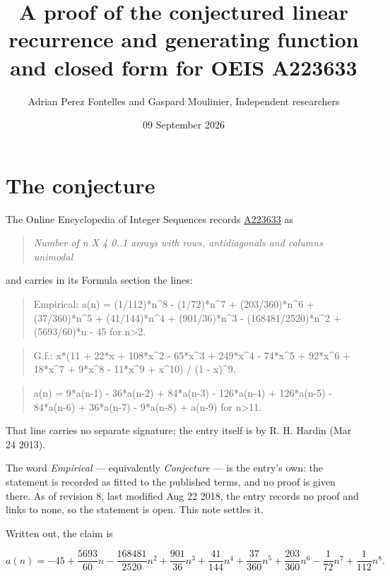 \documentclass[11pt]{article}
\title{A proof of the conjectured linear recurrence and generating function and closed form for OEIS A223633}
\author{Adrian Perez Fontelles and Gaspard Moulinier, Independent researchers}
\date{09 September 2026}
\theoremstyle{definition}
\begin{document}
\maketitle
\section{The conjecture}

The Online Encyclopedia of Integer Sequences records \href{https://oeis.org/A223633}{A223633} as

\begin{quote}\itshape Number of n X 4 0..1 arrays with rows, antidiagonals and columns unimodal\end{quote}

and carries in its Formula section the lines:

\begin{quote}\ttfamily Empirical: a(n) = (1/112)*n\textasciicircum{}8 - (1/72)*n\textasciicircum{}7 + (203/360)*n\textasciicircum{}6 + (37/360)*n\textasciicircum{}5 + (41/144)*n\textasciicircum{}4 + (901/36)*n\textasciicircum{}3 - (168481/2520)*n\textasciicircum{}2 + (5693/60)*n - 45 for n>2.\end{quote}

\begin{quote}\ttfamily G.f.: x*(11 + 22*x + 108*x\textasciicircum{}2 - 65*x\textasciicircum{}3 + 249*x\textasciicircum{}4 - 74*x\textasciicircum{}5 + 92*x\textasciicircum{}6 + 18*x\textasciicircum{}7 + 9*x\textasciicircum{}8 - 11*x\textasciicircum{}9 + x\textasciicircum{}10) / (1 - x)\textasciicircum{}9.\end{quote}

\begin{quote}\ttfamily a(n) = 9*a(n-1) - 36*a(n-2) + 84*a(n-3) - 126*a(n-4) + 126*a(n-5) - 84*a(n-6) + 36*a(n-7) - 9*a(n-8) + a(n-9) for n>11.\end{quote}

That line carries no separate signature; the entry itself is by R. H. Hardin (Mar 24 2013).

The word {\itshape Empirical} --- equivalently {\itshape Conjecture} --- is the entry's own: the statement is recorded as fitted to the published terms, and no proof is given there. As of revision 8, last modified Aug 22 2018, the entry records no proof and links to none, so the statement is open. This note settles it.

Written out, the claim is

\[a(n) = -45 + \frac{5693}{60}n - \frac{168481}{2520}n^{2} + \frac{901}{36}n^{3} + \frac{41}{144}n^{4} + \frac{37}{360}n^{5} + \frac{203}{360}n^{6} - \frac{1}{72}n^{7} + \frac{1}{112}n^{8}.\]
\end{document}
